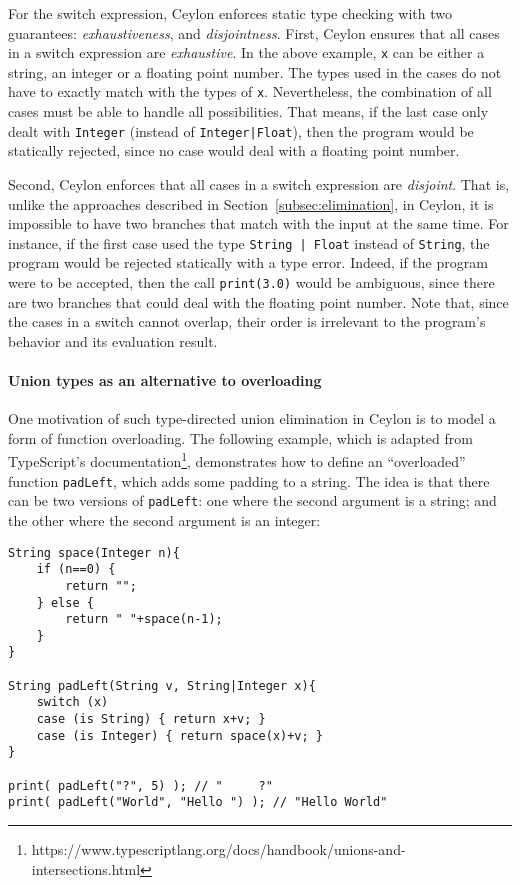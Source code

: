 For the switch expression, Ceylon enforces static type checking with two
guarantees: \textit{exhaustiveness}, and \textit{disjointness}. First, Ceylon
ensures that all cases in a switch expression are \textit{exhaustive}. In the above
example, \lstinline{x} can be either a string, an integer or a floating point
number. The types used in the cases do not have to exactly match with the types
of \lstinline{x}. Nevertheless, the combination of all cases must be able to
handle all possibilities. That means, if the last case only dealt with
\lstinline{Integer} (instead of \lstinline{Integer|Float}), then the program
would be statically rejected, since no case would deal with a floating point
number.

Second, Ceylon enforces that all cases in a switch expression are
\textit{disjoint}. That is, unlike the approaches described in
Section~\ref{subsec:elimination}, in Ceylon, it is impossible to have two
branches that match with the input at the same time. For instance, if the first
case used the type \lstinline{String | Float} instead of \lstinline{String}, the
program would be rejected statically with a type error. Indeed, if the program
were to be accepted, then the call \lstinline{print(3.0)} would be ambiguous,
since there are two branches that could deal with the floating point number. Note that, since
the cases in a switch cannot overlap, their order is irrelevant to the program's
behavior and its evaluation result.

\paragraph{Union types as an alternative to overloading}
One motivation of such type-directed union elimination in Ceylon is to
model a form of function overloading.
The following example, which is adapted from TypeScript's documentation\footnote{https://www.typescriptlang.org/docs/handbook/unions-and-intersections.html},
demonstrates how to define an ``overloaded'' function \lstinline{padLeft},
which adds some padding to a string. The idea is that there can be two versions
of \lstinline{padLeft}: one where the second argument is a string; and
the other where the second argument is an integer:

\begin{lstlisting}
String space(Integer n){
	if (n==0) {
		return "";
	} else {
		return " "+space(n-1);
	}
}

String padLeft(String v, String|Integer x){
	switch (x)
	case (is String) { return x+v; }
	case (is Integer) { return space(x)+v; }
}

print( padLeft("?", 5) ); // "     ?"
print( padLeft("World", "Hello ") ); // "Hello World"
\end{lstlisting}
%

